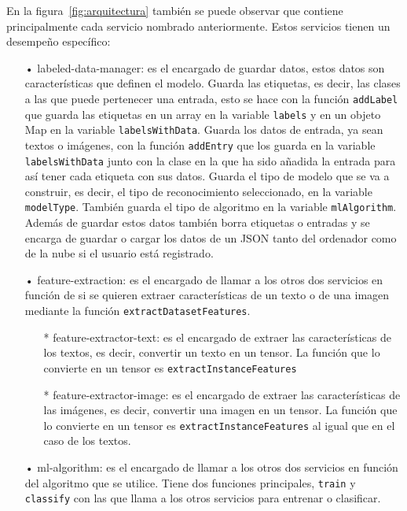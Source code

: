 \documentclass[a4paper, 12pt]{book}
\begin{document}
En la figura~\ref{fig:arquitectura} también se puede observar que contiene principalmente cada servicio nombrado anteriormente. Estos servicios tienen un desempeño específico:

\begin{itemize}
	\item[•] labeled-data-manager: es el encargado de guardar datos, estos datos son características que definen el modelo. Guarda las etiquetas, es decir, las clases a las que puede pertenecer una entrada, esto se hace con la función \texttt{addLabel} que guarda las etiquetas en un array en la variable \texttt{labels} y en un objeto Map en la variable \texttt{labelsWithData}. 
	Guarda los datos de entrada, ya sean textos o imágenes, con la función \texttt{addEntry} que los guarda en la variable \texttt{labelsWithData} junto con la clase en la que ha sido añadida la entrada para así tener cada etiqueta con sus datos. Guarda el tipo de modelo que se va a construir, es decir, el tipo de reconocimiento seleccionado, en la variable \texttt{modelType}. También guarda el tipo de algoritmo en la variable \texttt{mlAlgorithm}. 
	Además de guardar estos datos también borra etiquetas o entradas y se encarga de guardar o cargar los datos de un JSON tanto del ordenador como de la nube si el usuario está registrado.
	
	\item[•] feature-extraction: es el encargado de llamar a los otros dos servicios en función de si se quieren extraer características de un texto o de una imagen mediante la función \texttt{extractDatasetFeatures}.
	
	\begin{itemize}
		\item[*] feature-extractor-text: es el encargado de extraer las características de los textos, es decir, convertir un texto en un tensor. 
		La función que lo convierte en un tensor es \texttt{extractInstanceFeatures}
		
		\item[*] feature-extractor-image: es el encargado de extraer las características de las imágenes, es decir, convertir una imagen en un tensor. 
		La función que lo convierte en un tensor es \texttt{extractInstanceFeatures} al igual que en el caso de los textos.
	\end{itemize}
	
	\item[•] ml-algorithm: es el encargado de llamar a los otros dos servicios en función del algoritmo que se utilice. 
	Tiene dos funciones principales, \texttt{train} y \texttt{classify} con las que llama a los otros servicios para entrenar o clasificar.
	

\end{itemize}
\end{document}
